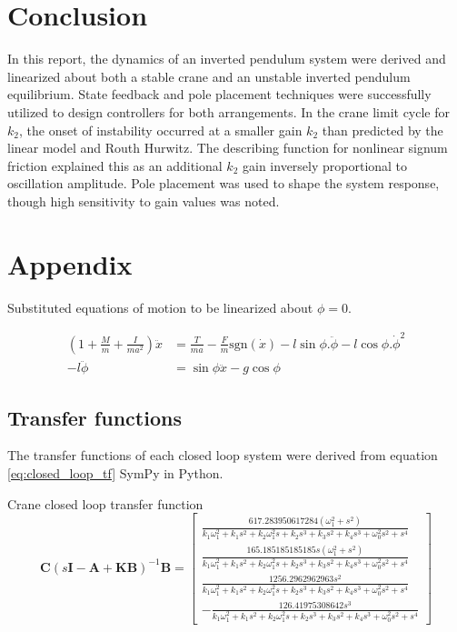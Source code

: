 \documentclass{article}
\begin{document}


\section{Conclusion}

In this report, the dynamics of an inverted pendulum system were derived and linearized about both a stable crane and an unstable inverted pendulum equilibrium.
State feedback and pole placement techniques were successfully utilized to design controllers for both arrangements.
In the crane limit cycle for $k_2$, the onset of instability occurred at a smaller gain $k_2$ than predicted by the linear model and Routh Hurwitz.
The describing function for nonlinear signum friction explained this as an additional $k_2$ gain inversely proportional to oscillation amplitude.
Pole placement was used to shape the system response, though high sensitivity to gain values was noted.

\newpage
\section{Appendix}

Substituted equations of motion to be linearized about $\phi = 0$.

\begin{align}
  \left( 1 + \frac{M}{m} + \frac{I}{ma^2} \right) \ddot{x} &= \frac{T}{ma} - \frac{F}{m}\text{sgn}(\dot{x}) - l\sin\phi . \ddot{\phi} - l\cos\phi . \dot{\phi}^2 \\
   - l \ddot{\phi} &= \sin\phi \ddot{x} - g\cos\phi
\end{align}

\subsection{Transfer functions}

The transfer functions of each closed loop system were derived from equation \ref{eq:closed_loop_tf} SymPy in Python.

Crane closed loop transfer function
\begin{equation}
  \mathbf{C} (s\mathbf{I} - \mathbf{A} + \mathbf{KB}) ^{-1} \mathbf{B} = \left[\begin{matrix}\frac{617.283950617284 \left(\omega_{1}^{2} + s^{2}\right)}{k_{1} \omega_{1}^{2} + k_{1} s^{2} + k_{2} \omega_{1}^{2} s + k_{2} s^{3} + k_{3} s^{2} + k_{4} s^{3} + \omega_{0}^{2} s^{2} + s^{4}}\\\frac{165.185185185185 s \left(\omega_{1}^{2} + s^{2}\right)}{k_{1} \omega_{1}^{2} + k_{1} s^{2} + k_{2} \omega_{1}^{2} s + k_{2} s^{3} + k_{3} s^{2} + k_{4} s^{3} + \omega_{0}^{2} s^{2} + s^{4}}\\\frac{1256.2962962963 s^{2}}{k_{1} \omega_{1}^{2} + k_{1} s^{2} + k_{2} \omega_{1}^{2} s + k_{2} s^{3} + k_{3} s^{2} + k_{4} s^{3} + \omega_{0}^{2} s^{2} + s^{4}}\\- \frac{126.41975308642 s^{3}}{k_{1} \omega_{1}^{2} + k_{1} s^{2} + k_{2} \omega_{1}^{2} s + k_{2} s^{3} + k_{3} s^{2} + k_{4} s^{3} + \omega_{0}^{2} s^{2} + s^{4}}\end{matrix}\right]
\end{equation}
\end{document}

